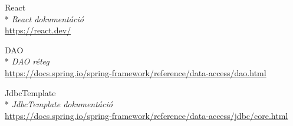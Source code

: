 \begin{thebibliography}{x}
 React\\*
\textit{React dokumentáció}
\\ \url{https://react.dev/}

 DAO\\*
\textit{DAO réteg}
\\ \url{https://docs.spring.io/spring-framework/reference/data-access/dao.html}

 JdbcTemplate\\*
\textit{JdbcTemplate dokumentáció}
\\ \url{https://docs.spring.io/spring-framework/reference/data-access/jdbc/core.html}




\end{thebibliography}